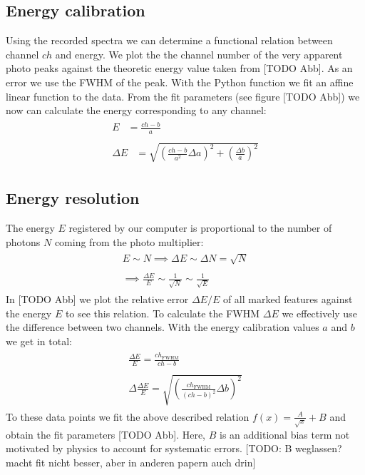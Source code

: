 \subsection{Energy calibration}
%
Using the recorded spectra we can determine a functional relation between channel $ch$ and energy.
We plot the the channel number of the very apparent photo peaks against the theoretic energy value taken from [TODO Abb].
As an error we use the FWHM of the peak.
With the  Python function we fit an affine linear function to the data.
From the fit parameters (see figure [TODO Abb]) we now can calculate the energy corresponding to any channel:
\begin{align}
    \label{eq:}
    \begin{split}
        E &= \frac{ch - b}{a}
    \end{split}
    \\
    \label{eq:}
    \begin{split}
        \Delta E &= \sqrt{ \left ( \frac{ch - b}{a^2} \Delta a \right ) ^2 + \left ( \frac{\Delta b}{a} \right ) ^2 }
    \end{split}
\end{align}
%
\subsection{Energy resolution}
%
The energy $E$ registered by our computer is proportional to the number of photons $N$ coming from the photo multiplier:
\begin{align}
    \label{eq:}
    \begin{split}
        E \sim N \implies \Delta E \sim \Delta N = \sqrt{N}
    \end{split}
    \\
    \label{eq:}
    \begin{split}
        \implies \frac{\Delta E}{E} \sim \frac{1}{\sqrt{N}} \sim \frac{1}{\sqrt{E}}
    \end{split}
\end{align}
%
In [TODO Abb] we plot the relative error $\Delta E / E$ of all marked features against the energy $E$ to see this relation.
To calculate the FWHM $\Delta E$ we effectively use the difference between two channels.
With the energy calibration values $a$ and $b$ we get in total:
\begin{align}
    \label{eq:}
    \begin{split}
        \frac{\Delta E}{E} = \frac{ch_{\text{FWHM}}}{ch - b}
    \end{split}
    \\
    \label{eq:}
    \begin{split}
        \Delta \frac{\Delta E}{E} =  \sqrt{ \left( \frac{ch_{\text{FWHM}}}{(ch-b)^2} \Delta b \right)^2 }
    \end{split}
\end{align}
%
To these data points we fit the above described relation $f(x) = \frac{A}{\sqrt{x}} + B$ and obtain the fit parameters [TODO Abb].
Here, $B$ is an additional bias term not motivated by physics to account for systematic errors.
[TODO: B weglassen? macht fit nicht besser, aber in anderen papern auch drin]
%
